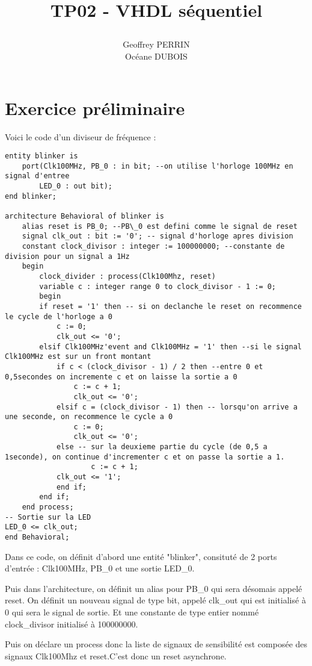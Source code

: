 \documentclass[11pt]{report}
\title{\textbf{TP02 - VHDL séquentiel}
\author{Geoffrey PERRIN \\ Océane DUBOIS\\}
\date{}}
\begin{document}
\maketitle

\newpage

\section{Exercice préliminaire}

Voici le code d'un diviseur de fréquence : 
\begin{lstlisting}
entity blinker is
	port(Clk100MHz, PB_0 : in bit; --on utilise l'horloge 100MHz en signal d'entree
		LED_0 : out bit);
end blinker;

architecture Behavioral of blinker is
	alias reset is PB_0; --PB\_0 est defini comme le signal de reset
	signal clk_out : bit := '0'; -- signal d'horloge apres division
	constant clock_divisor : integer := 100000000; --constante de division pour un signal a 1Hz
	begin
		clock_divider : process(Clk100Mhz, reset)
		variable c : integer range 0 to clock_divisor - 1 := 0;
		begin
		if reset = '1' then -- si on declanche le reset on recommence le cycle de l'horloge a 0
			c := 0;
			clk_out <= '0';
		elsif Clk100MHz'event and Clk100MHz = '1' then --si le signal Clk100MHz est sur un front montant
			if c < (clock_divisor - 1) / 2 then --entre 0 et 0,5secondes on incremente c et on laisse la sortie a 0
				c := c + 1;
				clk_out <= '0';
			elsif c = (clock_divisor - 1) then -- lorsqu'on arrive a une seconde, on recommence le cycle a 0
				c := 0;
				clk_out <= '0';
			else -- sur la deuxieme partie du cycle (de 0,5 a 1seconde), on continue d'incrementer c et on passe la sortie a 1.
					c := c + 1;
			clk_out <= '1';
			end if;
		end if;
	end process;
-- Sortie sur la LED
LED_0 <= clk_out;
end Behavioral;
\end{lstlisting}

Dans ce code, on définit d'abord une entité "blinker", consituté de 2 ports d'entrée : Clk100MHz, PB\_0 et une sortie LED\_0.

Puis dans l'architecture, on définit un alias pour PB\_0 qui sera désomais appelé reset. On définit un nouveau signal de type bit, appelé clk\_out qui est initialisé à 0 qui sera le signal de sortie.  Et une constante de type entier nommé clock\_divisor initialisé à 100000000. 

Puis on déclare un process donc la liste de signaux de sensibilité est composée des signaux Clk100Mhz et reset.C'est donc un reset asynchrone.  
\end{document}
